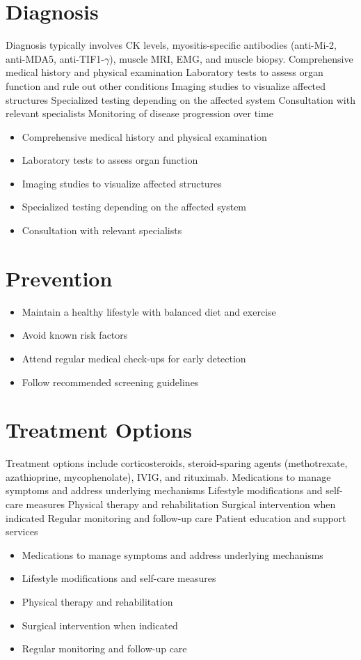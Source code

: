 \section{Diagnosis}
Diagnosis typically involves CK levels, myositis-specific antibodies (anti-Mi-2, anti-MDA5, anti-TIF1-$\gamma$), muscle MRI, EMG, and muscle biopsy. Comprehensive medical history and physical examination Laboratory tests to assess organ function and rule out other conditions Imaging studies to visualize affected structures Specialized testing depending on the affected system Consultation with relevant specialists Monitoring of disease progression over time

\begin{itemize}[noitemsep]
  \item Comprehensive medical history and physical examination
  \item Laboratory tests to assess organ function
  \item Imaging studies to visualize affected structures
  \item Specialized testing depending on the affected system
  \item Consultation with relevant specialists
\end{itemize}
\section{Prevention}
\begin{itemize}[noitemsep]
  \item Maintain a healthy lifestyle with balanced diet and exercise
  \item Avoid known risk factors
  \item Attend regular medical check-ups for early detection
  \item Follow recommended screening guidelines
\end{itemize}
\section{Treatment Options}
Treatment options include corticosteroids, steroid-sparing agents (methotrexate, azathioprine, mycophenolate), IVIG, and rituximab. Medications to manage symptoms and address underlying mechanisms Lifestyle modifications and self-care measures Physical therapy and rehabilitation Surgical intervention when indicated Regular monitoring and follow-up care Patient education and support services

\begin{itemize}[noitemsep]
  \item Medications to manage symptoms and address underlying mechanisms
  \item Lifestyle modifications and self-care measures
  \item Physical therapy and rehabilitation
  \item Surgical intervention when indicated
  \item Regular monitoring and follow-up care
\end{itemize}
